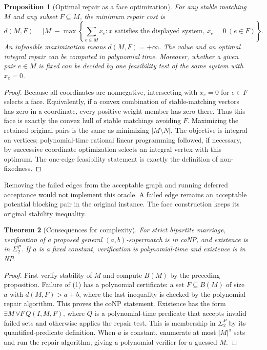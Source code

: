 \documentclass[11pt,a4paper]{article}
\newtheorem{theorem}{Theorem}[section]
\newtheorem{proposition}[theorem]{Proposition}
\theoremstyle{definition}
\theoremstyle{remark}
\begin{document}
\begin{proposition}[Optimal repair as a face optimization]
For any stable matching $M$ and any subset $F\subseteq M$, the minimum repair cost is
\[
 d(M,F)=|M|-\max\left\{\sum_{e\in M}x_e:
                    x\text{ satisfies the displayed system},\ x_e=0\ (e\in F)\right\}.
\]
An infeasible maximization means $d(M,F)=+\infty$. The value and an optimal integral repair can be computed in polynomial time. Moreover, whether a given pair $e\in M$ is fixed can be decided by one feasibility test of the same system with $x_e=0$.
\end{proposition}
\begin{proof}
Because all coordinates are nonnegative, intersecting with $x_e=0$ for $e\in F$ selects a face. Equivalently, if a convex combination of stable-matching vectors has zero in a coordinate, every positive-weight member has zero there. Thus this face is exactly the convex hull of stable matchings avoiding $F$. Maximizing the retained original pairs is the same as minimizing $|M\setminus N|$. The objective is integral on vertices; polynomial-time rational linear programming followed, if necessary, by successive coordinate optimization selects an integral vertex with this optimum. The one-edge feasibility statement is exactly the definition of non-fixedness.
\end{proof}

Removing the failed edges from the acceptable graph and running deferred acceptance would not implement this oracle. A failed edge remains an acceptable potential blocking pair in the original instance. The face construction keeps its original stability inequality.

\begin{theorem}[Consequences for complexity]
For strict bipartite marriage, verification of a proposed general $(a,b)$-supermatch is in coNP, and existence is in $\Sigma_2^P$. If $a$ is a fixed constant, verification is polynomial-time and existence is in NP.
\end{theorem}
\begin{proof}
First verify stability of $M$ and compute $B(M)$ by the preceding proposition. Failure of (1) has a polynomial certificate: a set $F\subseteq B(M)$ of size $a$ with $d(M,F)>a+b$, where the last inequality is checked by the polynomial repair algorithm. This proves the coNP statement. Existence has the form $\exists M\,\forall F\,Q(I,M,F)$, where $Q$ is a polynomial-time predicate that accepts invalid failed sets and otherwise applies the repair test. This is membership in $\Sigma_2^P$ by its quantified-predicate definition. When $a$ is constant, enumerate at most $|M|^a$ sets and run the repair algorithm, giving a polynomial verifier for a guessed $M$.
\end{proof}
\end{document}
